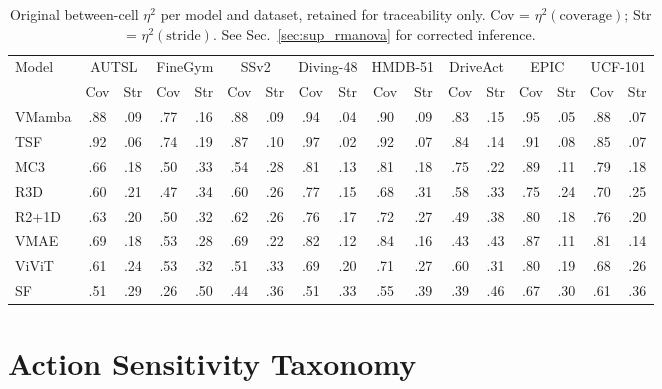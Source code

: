\documentclass[runningheads]{llncs}
\newcommand{\tabtight}{\setlength{\tabcolsep}{3.5pt}\renewcommand{\arraystretch}{1.12}}
\newcommand{\rev}[1]{\textcolor{revblue}{#1}}
\begin{document}
\begin{table}[!htbp]
\centering
\caption{\rev{Original between-cell $\eta^2$ per model and dataset, retained for traceability only. Cov = $\eta^2(\text{coverage})$; Str = $\eta^2(\text{stride})$. See Sec.~\ref{sec:sup_rmanova} for corrected inference.}}
\label{tab:anova_full}
\scriptsize\tabtight
\begin{adjustbox}{max width=\textwidth}
\begin{tabular}{l *{8}{cc}}
\toprule
\multirow{2}{*}{Model} & \multicolumn{2}{c}{AUTSL} & \multicolumn{2}{c}{FineGym} & \multicolumn{2}{c}{SSv2} & \multicolumn{2}{c}{Diving-48} & \multicolumn{2}{c}{HMDB-51} & \multicolumn{2}{c}{DriveAct} & \multicolumn{2}{c}{EPIC}
 & \multicolumn{2}{c}{UCF-101} \\
\cmidrule(lr){2-3}\cmidrule(lr){4-5}\cmidrule(lr){6-7}\cmidrule(lr){8-9} \cmidrule(lr){10-11}\cmidrule(lr){12-13}\cmidrule(lr){14-15}\cmidrule(lr){16-17} & Cov & Str & Cov & Str & Cov & Str & Cov & Str & Cov & Str & Cov & Str & Cov & Str
 & Cov & Str \\
\midrule
VMamba & .88 & .09 & .77 & .16 & .88 & .09 & .94 & .04 & .90 & .09 & .83 & .15 & .95 & .05 & .88 & .07 \\
TSF    & .92 & .06 & .74 & .19 & .87 & .10 & .97 & .02 & .92 & .07 & .84 & .14 & .91 & .08 & .85 & .07 \\
MC3    & .66 & .18 & .50 & .33 & .54 & .28 & .81 & .13 & .81 & .18 & .75 & .22 & .89 & .11 & .79 & .18 \\
R3D    & .60 & .21 & .47 & .34 & .60 & .26 & .77 & .15 & .68 & .31 & .58 & .33 & .75 & .24 & .70 & .25 \\
R2+1D  & .63 & .20 & .50 & .32 & .62 & .26 & .76 & .17 & .72 & .27 & .49 & .38 & .80 & .18 & .76 & .20 \\
VMAE   & .69 & .18 & .53 & .28 & .69 & .22 & .82 & .12 & .84 & .16 & .43 & .43 & .87 & .11 & .81 & .14 \\
ViViT  & .61 & .24 & .53 & .32 & .51 & .33 & .69 & .20 & .71 & .27 & .60 & .31 & .80 & .19 & .68 & .26 \\
SF     & .51 & .29 & .26 & .50 & .44 & .36 & .51 & .33 & .55 & .39 & .39 & .46 & .67 & .30 & .61 & .36 \\
\bottomrule
\end{tabular}
\end{adjustbox}
\end{table}

\section{Action Sensitivity Taxonomy}
\label{sec:sup_taxonomy}
\end{document}
